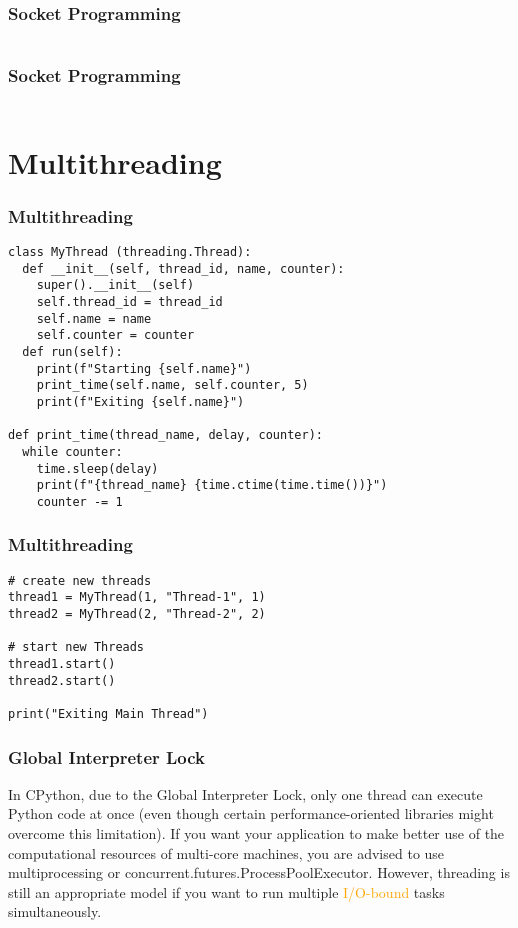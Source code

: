 \documentclass{../py-lecture}
\begin{document}
\begin{frame}[fragile]
	\frametitle{Socket Programming}
  \inputminted[bgcolor=Black,fontsize=\scriptsize]{python}{./src/server.py}
\end{frame}

\begin{frame}[fragile]
	\frametitle{Socket Programming}
  \inputminted[bgcolor=Black,fontsize=\scriptsize]{python}{./src/client.py}
\end{frame}

\section{Multithreading}

\begin{frame}[fragile]
	\frametitle{Multithreading}
  \begin{verbatim}
class MyThread (threading.Thread):
  def __init__(self, thread_id, name, counter):
    super().__init__(self)
    self.thread_id = thread_id
    self.name = name
    self.counter = counter
  def run(self):
    print(f"Starting {self.name}")
    print_time(self.name, self.counter, 5)
    print(f"Exiting {self.name}")

def print_time(thread_name, delay, counter):
  while counter:
    time.sleep(delay)
    print(f"{thread_name} {time.ctime(time.time())}")
    counter -= 1
  \end{verbatim}
\end{frame}

\begin{frame}[fragile]
	\frametitle{Multithreading}
  \begin{verbatim}
# create new threads
thread1 = MyThread(1, "Thread-1", 1)
thread2 = MyThread(2, "Thread-2", 2)

# start new Threads
thread1.start()
thread2.start()

print("Exiting Main Thread")
  \end{verbatim}
\end{frame}

\begin{frame}
  \frametitle{Global Interpreter Lock}
  \begin{block}{}
    In CPython, due to the Global Interpreter Lock, only one thread can execute Python code at once (even though certain performance-oriented libraries might overcome this limitation).
    If you want your application to make better use of the computational resources of multi-core machines,
    you are advised to use multiprocessing or concurrent.futures.ProcessPoolExecutor. However, threading is still an appropriate model
    if you want to run multiple \textcolor{Orange}{I/O-bound} tasks simultaneously.
  \end{block}
\end{frame}
\end{document}
